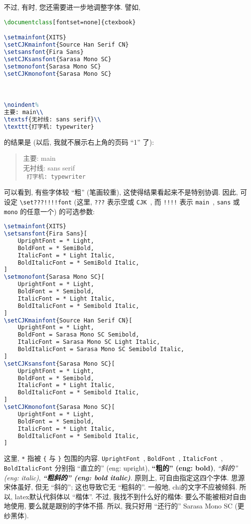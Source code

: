 不过, 有时, 您还需要进一步地调整字体.
譬如,
\begin{lstlisting}[language=TeX]
\documentclass[fontset=none]{ctexbook}

\setmainfont{XITS}
\setCJKmainfont{Source Han Serif CN}
\setsansfont{Fira Sans}
\setCJKsansfont{Sarasa Mono SC}
\setmonofont{Sarasa Mono SC}
\setCJKmonofont{Sarasa Mono SC}



\noindent%
主要: main\\
\textsf{无衬线: sans serif}\\
\texttt{打字机: typewriter}


\end{lstlisting}
的结果是 (以后, 我就不展示右上角的页码 ``1'' 了):
\begin{quotation}
    \noindent%
    \textrm{%
        主要: main}\\
    \textsf{%
        无衬线: sans serif}\\
    \texttt{%
        打字机: typewriter}
\end{quotation}
可以看到, 有些字体较 ``粗'' (笔画较重),
这使得结果看起来不是特别协调.
因此, 可设定 \verb`\set???!!!!font`
(这里, \verb`???` 表示空或 \verb`CJK`~,
而 \verb`!!!!` 表示
\verb`main`~, \verb`sans` 或 \verb`mono`
的任意一个)
的可选参数:
\begin{lstlisting}[language=TeX]
\setmainfont{XITS}
\setsansfont{Fira Sans}[
    UprightFont = * Light,
    BoldFont = * SemiBold,
    ItalicFont = * Light Italic,
    BoldItalicFont = * SemiBold Italic,
]
\setmonofont{Sarasa Mono SC}[
    UprightFont = * Light,
    BoldFont = * Semibold,
    ItalicFont = * Light Italic,
    BoldItalicFont = * Semibold Italic,
]
\setCJKmainfont{Source Han Serif CN}[
    UprightFont = * Light,
    BoldFont = Sarasa Mono SC Semibold,
    ItalicFont = Sarasa Mono SC Light Italic,
    BoldItalicFont = Sarasa Mono SC Semibold Italic,
]
\setCJKsansfont{Sarasa Mono SC}[
    UprightFont = * Light,
    BoldFont = * Semibold,
    ItalicFont = * Light Italic,
    BoldItalicFont = * Semibold Italic,
]
\setCJKmonofont{Sarasa Mono SC}[
    UprightFont = * Light,
    BoldFont = * Semibold,
    ItalicFont = * Light Italic,
    BoldItalicFont = * Semibold Italic,
]
\end{lstlisting}
这里, \verb`*` 指被 \verb`{` 与 \verb`}` 包围的内容.
\verb`UprightFont`~, \verb`BoldFont`~,
\verb`ItalicFont`~, \verb`BoldItalicFont`
分别指
\textrm{``直立的'' (\gls{eng}: upright)},
\textbf{``粗的'' (\gls{eng}: bold)},
\textit{``斜的'' (\gls{eng}: italic)},
\textbf{\textit{``粗斜的'' (\gls{eng}: bold italic)}}.
原则上, 可自由指定这四个字体.
思源宋体虽好, 但无 ``斜的'';
这也导致它无 ``粗斜的''.
一般地, \gls{chi}的文字不应被倾斜.
所以, \gls{latex}默认代斜体以 ``楷体''.
不过, 我找不到什么好的楷体:
要么不能被相对自由地使用,
要么就是跟别的字体不搭.
所以, 我只好用 ``还行的'' Sarasa Mono SC (更纱黑体).

